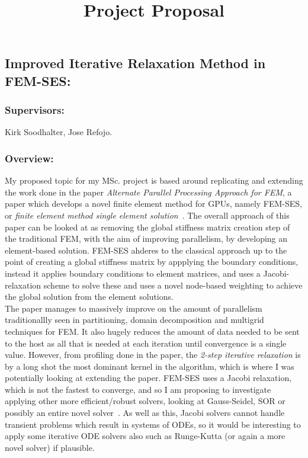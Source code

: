 \documentclass[12pt]{article}
\begin{document}
\title{Project Proposal}

\subsection*{Improved Iterative Relaxation Method in FEM-SES:}
\subsubsection*{Supervisors:}
Kirk Soodhalter, Jose Refojo.
\subsubsection*{Overview:}
My proposed topic for my MSc. project is based around replicating and extending the work done in the paper \textit{Alternate Parallel Processing Approach for FEM}, a paper which develops a novel finite element method for GPUs, namely FEM-SES, or \textit{finite element method single element solution}~\cite{femses}. The overall approach of this paper can be looked at as removing the global stiffness matrix creation step of the traditional FEM, with the aim of improving parallelism, by developing an element-based solution. FEM-SES ahderes to the classical approach up to the point of creating a global stiffness matrix by appplying the boundary conditions, instead it applies boundary conditions to element matrices, and uses a Jacobi-relaxation scheme to solve these and uses a novel node-based weighting to achieve the global solution from the element solutions.\\
The paper manages to massively improve on the amount of parallelism traditionallly seen in partitioning, domain decomposition and multigrid techniques for FEM. It also hugely reduces the amount of data needed to be sent to the host as all that is needed at each iteration until convergence is a single value. However, from profiling done in the paper, the \textit{2-step iterative relaxation} is by a long shot the most dominant kernel in the algorithm, which is where I was potentially looking at extending the paper. FEM-SES uses a Jacobi relaxation, which is not the fastest to converge, and so I am proposing to investigate applying other more efficient/robust solvers, looking at Gauss-Seidel, SOR or possibly an entire novel solver~\cite{iter}. As well as this, Jacobi solvers cannot handle transient problems which result in systems of ODEs, so it would be interesting to apply some iterative ODE solvers also such as Runge-Kutta (or again a more novel solver) if plausible.
\end{document}
